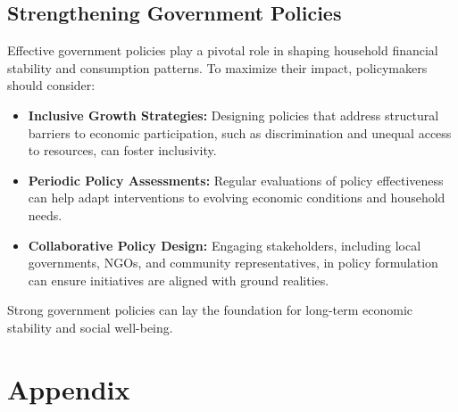 \documentclass{article}
\begin{document}
\subsection{Strengthening Government Policies}
Effective government policies play a pivotal role in shaping household financial stability and consumption patterns. To maximize their impact, policymakers should consider:
\begin{itemize}
	\item \textbf{Inclusive Growth Strategies:} 
	Designing policies that address structural barriers to economic participation, such as discrimination and unequal access to resources, can foster inclusivity.
	\item \textbf{Periodic Policy Assessments:} 
	Regular evaluations of policy effectiveness can help adapt interventions to evolving economic conditions and household needs.
	\item \textbf{Collaborative Policy Design:} 
	Engaging stakeholders, including local governments, NGOs, and community representatives, in policy formulation can ensure initiatives are aligned with ground realities.
\end{itemize}
Strong government policies can lay the foundation for long-term economic stability and social well-being.
\newpage

\section{Appendix}
\end{document}

